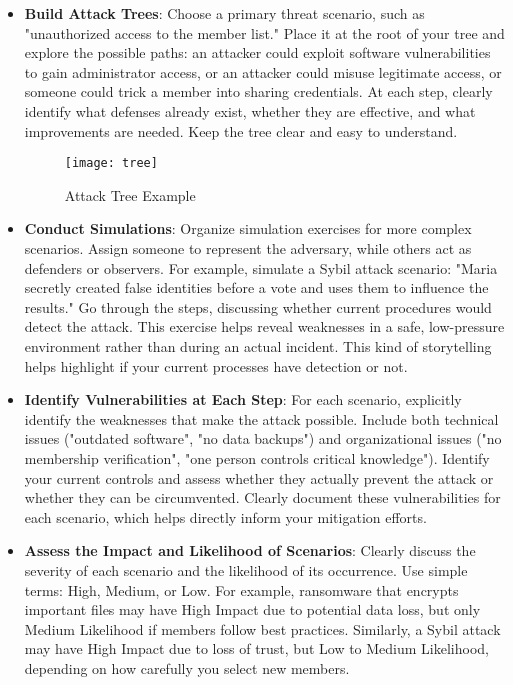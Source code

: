 \begin{itemize}

    \item \textbf{Build Attack Trees}: Choose a primary threat scenario, such as
    "unauthorized access to the member list." Place it at the root of your tree and
    explore the possible paths: an attacker could exploit software vulnerabilities
    to gain administrator access, or an attacker could misuse legitimate access, or
    someone could trick a member into sharing credentials. At each step, clearly
    identify what defenses already exist, whether they are effective, and what
    improvements are needed. Keep the tree clear and easy to understand.

    \begin{figure}[htbp]
        \centering
        \texttt{[image: tree]}
        \caption{Attack Tree Example}
        \label{fig:attack_tree_example}
    \end{figure}

    \item \textbf{Conduct Simulations}: Organize simulation exercises for
    more complex scenarios. Assign someone to represent the adversary, while others
    act as defenders or observers. For example, simulate a Sybil attack scenario:
    "Maria secretly created false identities before a vote and uses them to
    influence the results." Go through the steps, discussing whether current
    procedures would detect the attack. This exercise helps reveal weaknesses in a
    safe, low-pressure environment rather than during an actual incident.
    This kind of storytelling helps highlight if your current processes have detection or not.

    \item \textbf{Identify Vulnerabilities at Each Step}: For each scenario,
    explicitly identify the weaknesses that make the attack possible. Include both
    technical issues ("outdated software", "no data backups") and organizational
    issues ("no membership verification", "one person controls critical knowledge").
    Identify your current controls and assess whether they actually prevent the
    attack or whether they can be circumvented. Clearly document these
    vulnerabilities for each scenario, which helps directly inform your mitigation
    efforts.

    \item \textbf{Assess the Impact and Likelihood of Scenarios}: Clearly discuss
    the severity of each scenario and the likelihood of its occurrence. Use simple
    terms: High, Medium, or Low. For example, ransomware that encrypts
    important files may have High Impact due to potential data loss, but only
    Medium Likelihood if members follow best practices. Similarly, a Sybil attack
    may have High Impact due to loss of trust, but Low to Medium Likelihood,
    depending on how carefully you select new members.


\end{itemize}
